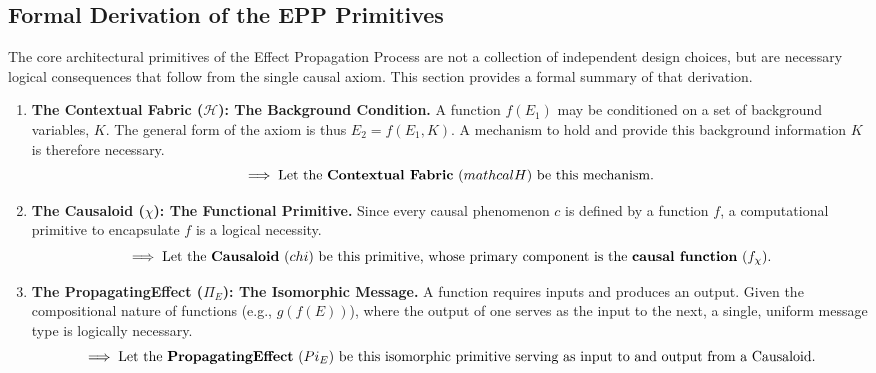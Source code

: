 \subsection{Formal Derivation of the EPP Primitives}
\label{sec:formalization_derivation}

The core architectural primitives of the Effect Propagation Process are not a collection of independent design choices, but are necessary logical consequences that follow from the single causal axiom. This section provides a formal summary of that derivation.

\begin{enumerate}
    \item \textbf{The Contextual Fabric ($\mathcal{H}$): The Background Condition.}\newline
    A function $f(E_1)$ may be conditioned on a set of background variables, $K$. The general form of the axiom is thus $E_2 = f(E_1, K)$.
    A mechanism to hold and provide this background information $K$ is therefore necessary.
    \begin{equation*}
        \implies \text{Let the \textbf{Contextual Fabric} ($\\mathcal{H}$) be this mechanism.}
    \end{equation*}

    \item \textbf{The Causaloid ($\chi$): The Functional Primitive.}\newline
    Since every causal phenomenon $c$ is defined by a function $f$, a computational primitive to encapsulate $f$ is a logical necessity.
    \begin{equation*}
        \implies \text{Let the \textbf{Causaloid} ($\\chi$) be this primitive, whose primary component is the \textbf{causal function} ($f_\chi$).}
    \end{equation*}

    \item \textbf{The PropagatingEffect ($\Pi_E$): The Isomorphic Message.}\newline
    A function requires inputs and produces an output. Given the compositional nature of functions (e.g., $g(f(E))$), where the output of one serves as the input to the next, a single, uniform message type is logically necessary.
    \begin{equation*}
        \implies \text{Let the \textbf{PropagatingEffect} ($\\Pi_E$) be this isomorphic primitive serving as input to and output from a Causaloid.}
    \end{equation*}


\end{enumerate}
